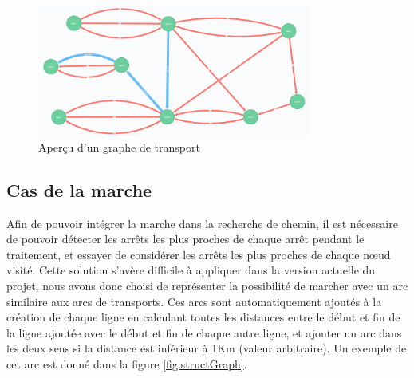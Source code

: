 %

\begin{figure}
	\center
	\includegraphics[width=0.8\textwidth]{img/GrapheNeo4j.png}
	\caption{Aperçu d'un graphe de transport}
\end{figure}


\subsection{Cas de la marche}
Afin de pouvoir intégrer la marche dans la recherche de chemin, il est nécessaire de pouvoir détecter les arrêts les plus proches de chaque arrêt pendant le traitement, et essayer de considérer les arrêts les plus proches de chaque nœud visité.\newline 
Cette solution s'avère difficile à appliquer dans la version actuelle du projet, nous avons donc choisi de représenter la possibilité de marcher avec un arc similaire aux arcs de transports.\newline
Ces arcs sont automatiquement ajoutés à la création de chaque ligne en calculant toutes les distances entre le début et fin de la ligne ajoutée avec le début et fin de chaque autre ligne, et ajouter un arc dans les deux sens si la distance est inférieur à 1Km (valeur arbitraire).
Un exemple de cet arc est donné dans la figure \ref{fig:structGraph}.

